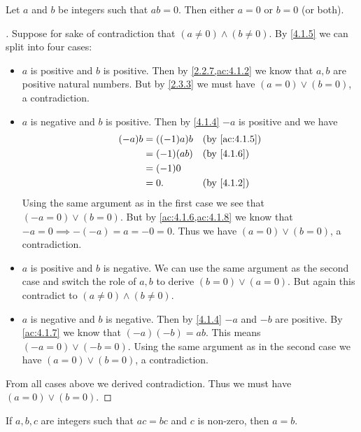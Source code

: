 \begin{prop}\label{4.1.8}
  Let \(a\) and \(b\) be integers such that \(ab = 0\).
  Then either \(a = 0\) or \(b = 0\) (or both).
\end{prop}

\begin{proof}[]
  Suppose for sake of contradiction that \((a \neq 0) \land (b \neq 0)\).
  By \cref{4.1.5} we can split into four cases:
  \begin{itemize}
    \item \(a\) is positive and \(b\) is positive.
          Then by \cref{2.2.7,ac:4.1.2} we know that \(a, b\) are positive natural numbers.
          But by \cref{2.3.3} we must have \((a = 0) \lor (b = 0)\), a contradiction.
    \item \(a\) is negative and \(b\) is positive.
          Then by \cref{4.1.4} \(-a\) is positive and we have
          \begin{align*}
            (-a) b & = ((-1) a) b &  & \by{ac:4.1.5} \\
                   & = (-1) (ab)  &  & \by{4.1.6}    \\
                   & = (-1) 0                        \\
                   & = 0.         &  & \by{4.1.2}
          \end{align*}
          Using the same argument as in the first case we see that \((-a = 0) \lor (b = 0)\).
          But by \cref{ac:4.1.6,ac:4.1.8} we know that \(-a = 0 \implies -(-a) = a = -0 = 0\).
          Thus we have \((a = 0) \lor (b = 0)\), a contradiction.
    \item \(a\) is positive and \(b\) is negative.
          We can use the same argument as the second case and switch the role of \(a, b\) to derive \((b = 0) \lor (a = 0)\).
          But again this contradict to \((a \neq 0) \land (b \neq 0)\).
    \item \(a\) is negative and \(b\) is negative.
          Then by \cref{4.1.4} \(-a\) and \(-b\) are positive.
          By \cref{ac:4.1.7} we know that \((-a)(-b) = ab\).
          This means \((-a = 0) \lor (-b = 0)\).
          Using the same argument as in the second case we have \((a = 0) \lor (b = 0)\), a contradiction.
  \end{itemize}
  From all cases above we derived contradiction.
  Thus we must have \((a = 0) \lor (b = 0)\).
\end{proof}

\begin{cor}\label{4.1.9}
  If \(a, b, c\) are integers such that \(ac = bc\) and \(c\) is non-zero, then \(a = b\).
\end{cor}

